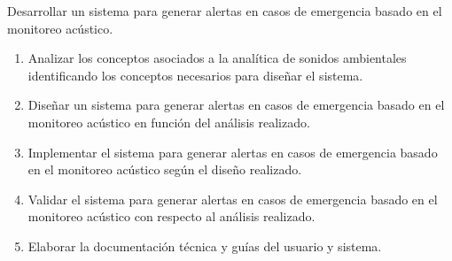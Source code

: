 

Desarrollar un sistema para generar alertas en casos de emergencia basado en el monitoreo acústico.


\newcommand{\oeOne}{Analizar los conceptos asociados a la analítica de sonidos ambientales identificando los conceptos necesarios para diseñar el sistema.}
\newcommand{\oeTwo}{Diseñar un sistema para generar alertas en casos de emergencia basado en el monitoreo acústico en función del análisis realizado.}
\newcommand{\oeThree}{Implementar el sistema para generar alertas en casos de emergencia basado en el monitoreo acústico según el diseño realizado.}
\newcommand{\oeFour}{Validar el sistema para generar alertas en casos de emergencia basado en el monitoreo acústico con respecto al análisis realizado.}
\newcommand{\oeFive}{Elaborar la documentación técnica y guías del usuario y sistema.}
\begin{enumerate}
  \item \oeOne
  \item \oeTwo
  \item \oeThree
  \item \oeFour
  \item \oeFive
\end{enumerate}
